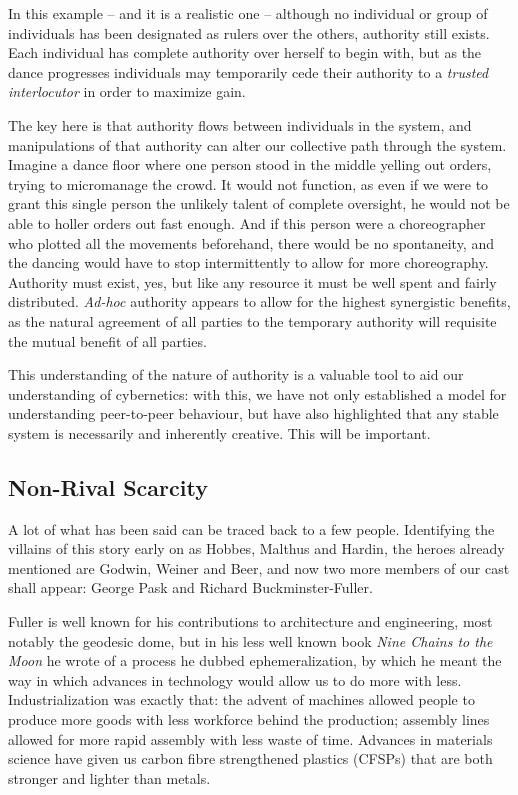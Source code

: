 In this example – and it is a realistic one – although no individual or group 
of individuals has been designated as rulers over the others, authority still
exists. Each individual has complete authority over herself to begin with, but
as the dance progresses individuals may temporarily cede their authority to a
\textit{trusted interlocutor} in order to maximize gain.

The key here is that authority f\hbox{}lows between individuals in the system,
and manipulations of that authority can alter our collective path through the
system. Imagine a dance f\hbox{}loor where one person stood in the middle
yelling out orders, trying to micromanage the crowd. It would not function, as
even if we were to grant this single person the unlikely talent of complete
oversight, he would not be able to holler orders out fast enough. And if this
person were a choreographer who plotted all the movements beforehand, there
would be no spontaneity, and the dancing would have to stop intermittently to
allow for more choreography. Authority must exist, yes, but like any resource 
it must be well spent and fairly distributed. \textit{Ad-hoc} authority appears
to allow for the highest synergistic benef\hbox{}its, as the natural agreement
of all parties to the temporary authority will requisite the mutual
benef\hbox{}it of all parties.

This understanding of the nature of authority is a valuable tool to aid our
understanding of cybernetics: with this, we have not only established a model
for understanding peer-to-peer behaviour, but have also highlighted that any
stable system is necessarily and inherently creative. This will be important.


\subsection{Non-Rival Scarcity}
\label{s:artificial_scarcity:burning_bridges:non-rival}

A lot of what has been said can be traced back to a few people. Identifying the
villains of this story early on as Hobbes, Malthus and Hardin, the heroes
already mentioned are Godwin, Weiner and Beer, and now two more members of our
cast shall appear: George Pask and Richard Buckminster-Fuller.

Fuller is well known for his contributions to architecture and engineering, 
most notably the geodesic dome, but in his less well known book \textit{Nine
Chains to the Moon} he wrote of a process he dubbed ephemeralization, by which
he meant the way in which advances in technology would allow us to do more with
less.  Industrialization was exactly that: the advent of machines allowed 
people to produce more goods with less workforce behind the production; 
assembly lines allowed for more rapid assembly with less waste of time. 
Advances in materials science have given us carbon f\hbox{}ibre strengthened
plastics (CFSPs) that are both stronger and lighter than metals.


